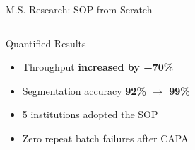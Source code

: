 \documentclass[aspectratio=169,10pt]{beamer}
\begin{document}
\begin{frame}{M.S. Research: SOP from Scratch}
\begin{columns}[T]
      \begin{alertblock}{Quantified Results}
        \small
        \begin{itemize}
          \item Throughput \textbf{increased by +70\%}
          \item Segmentation accuracy \textbf{92\% $\to$ 99\%}
          \item 5 institutions adopted the SOP
          \item Zero repeat batch failures after CAPA
        \end{itemize}
      \end{alertblock}
  \end{columns}
\end{frame}

\end{document}
